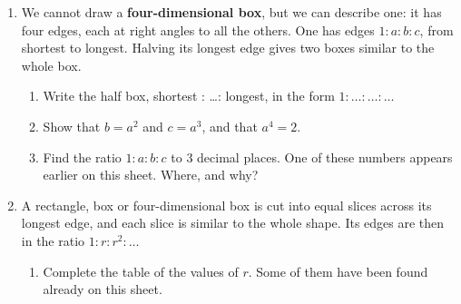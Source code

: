 \documentclass[11pt,a4paper]{article}
\begin{document}
\begin{enumerate}[resume]
\begin{enumerate}
  \setcounter{enumii}{2}
  \item Find the ratio $1:y:z$ exactly and to 3 decimal places.
  \item A block has a volume of $1$ litre ($1000\text{ cm}^3$). Find its
        edges, and show that one is $10$\,cm.
\end{enumerate}

\item We cannot draw a \textbf{four-dimensional box}, but we can describe one:
it has four edges, each at right angles to all the others. One has edges
$1:a:b:c$, from shortest to longest. Halving its longest edge gives two boxes
similar to the whole box.
\begin{enumerate}
  \item Write the half box, shortest : \ldots : longest, in the form
        $1:\ldots:\ldots:\ldots$
  \item Show that $b=a^2$ and $c=a^3$, and that $a^4=2$.
  \item Find the ratio $1:a:b:c$ to 3 decimal places. One of these numbers
        appears earlier on this sheet. Where, and why?
\end{enumerate}

\item A rectangle, box or four-dimensional box is cut into equal slices across
its longest edge, and each slice is similar to the whole shape. Its edges are
then in the ratio $1:r:r^2:\ldots$
\begin{enumerate}
  \item Complete the table of the values of $r$. Some of them have been found
        already on this sheet.


\end{enumerate}
\end{enumerate}
\end{document}
